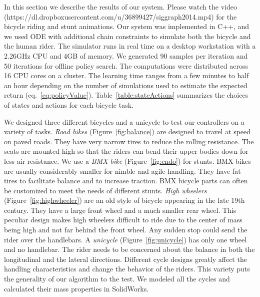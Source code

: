 In this section we describe the results of our system. Please watch the video (https://dl.dropboxusercontent.com/u/36899427/siggraph2014.mp4) for the bicycle riding and stunt
animations. Our system was implemented in C++, and we used ODE with additional chain constraints to simulate both the bicycle and the human rider. The simulator runs in real time on a desktop workstation with a 2.26GHz CPU and 4GB of memory. We generated 90 samples per iteration and 50 iterations for offline policy search. The computations were distributed across 16 CPU cores on a cluster. The learning time ranges from a few minutes to half an hour depending on the number of simulations used to estimate the expected return (eq.~\ref{eq:policyValue}). Table~\ref{table:stateActions} summarizes the choices of states and actions for each bicycle task.

We designed three different bicycles and a unicycle to test our controllers on a variety of tasks. \emph{Road bikes} (Figure~\ref{fig:balance}) are designed to travel at speed on paved roads. They have very narrow tires to reduce the rolling resistance. The seats are mounted high so that the riders can bend their upper bodies down for less air resistance. We use a \emph{BMX bike} (Figure~\ref{fig:endo}) for stunts. BMX bikes are usually considerably smaller for nimble and agile handling. They have fat tires to facilitate balance and to increase traction. BMX bicycle parts can often be customized to meet the needs of different stunts. \emph{High wheelers} (Figure~\ref{fig:highwheeler}) are an old style of bicycle appearing in the late 19th century. They have a large front wheel and a much smaller rear wheel. This peculiar design makes high wheelers difficult to ride due to the center of mass being high and not far behind the front wheel. Any sudden stop could send the rider over the handlebars. A \emph{unicycle} (Figure~\ref{fig:unicycle}) has only one wheel and no handlebar. The rider needs to be concerned about the balance in both the longitudinal and the lateral directions. Different cycle designs greatly affect the handling characteristics and change the behavior of the riders. This variety puts the generality of our algorithm to the test. We modeled all the cycles and calculated their mass properties in SolidWorks.

